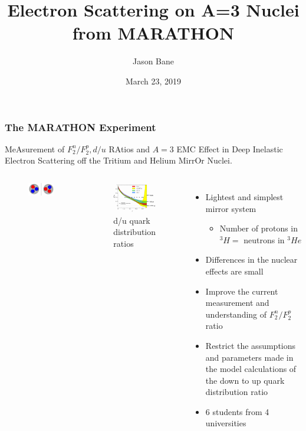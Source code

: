 \documentclass{beamer}
\title[MARATHON A=3]{Electron Scattering on A=3 Nuclei from MARATHON } %
\author{Jason Bane} %
\institute[UTK] %
{
	University of Tennessee \\ %
	\medskip
	\textit{jbane1@vols.utk.edu} %
}
\date{March 23, 2019} %
\begin{document}
\begin{frame}
	\titlepage %
\end{frame}


\begin{frame}
\frametitle{The MARATHON Experiment}
	MeAsurement of $F^n_2/F^p_2, d/u$ RAtios and $A=3$ EMC Effect in Deep Inelastic Electron Scattering off the Tritium and Helium MirrOr Nuclei.
	\vspace{-10pt}
	\begin{columns}[t]
		\begin{figure}
			\includegraphics[width =5cm]{../images/mirror}
		\end{figure}
		\vspace{-25pt}
		\begin{figure}
			\includegraphics[width=5cm]{../images/d_u}
			\caption{d/u quark distribution ratios}
		\end{figure}
		\begin{itemize}
			\item Lightest and simplest mirror system
		\begin{itemize}
			\item  Number of protons in $^3H =$ neutrons in $^3He$
		\end{itemize}
			\item Differences in the nuclear effects are small
			\item Improve the current measurement and understanding of $F^n_2/F^p_2$ ratio
			\item Restrict the assumptions and parameters made in the model calculations of the down to up quark distribution ratio
			\item 6 students from 4 universities
		\end{itemize}
	\end{columns}
\end{frame}
\end{document}
